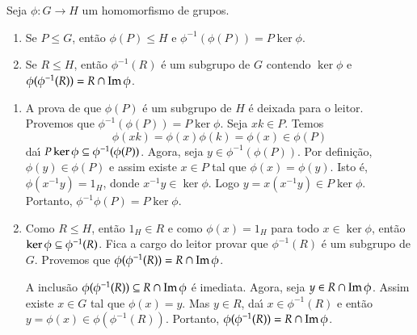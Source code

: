 \begin{lema}\label{imagem_direta_e_inversa_de_subgrupos}
	Seja $\phi : G \to H$ um homomorfismo de grupos.
	\begin{enumerate}[label=({\roman*})]
		\item Se $P \le G$, ent\~ao $\phi(P) \le H$ e $\phi^{-1}(\phi(P)) = P\ker\phi$.

		\item Se $R \le H$, ent\~ao $\phi^{-1}(R)$ \'e um subgrupo de $G$ contendo $\ker\phi$ e $\phi(\phi^{-1}(R)) = R \cap {\rm Im\,}\phi$.
	\end{enumerate}
\end{lema}
\begin{prova}
	\begin{enumerate}[label=({\roman*})]
		\item A prova de que $\phi(P)$ \'e um subgrupo de $H$ \'e deixada para o leitor. Provemos que $\phi^{-1}(\phi(P)) = P\ker\phi$. Seja $xk \in P$. Temos
		\[
			\phi(xk) = \phi(x)\phi(k) = \phi(x) \in \phi(P)
		\]
		da{\'\i} $P\ker\phi \subseteq \phi^{-1}(\phi(P))$. Agora, seja $y \in \phi^{-1}(\phi(P))$. Por defini\c{c}\~ao, $\phi(y) \in \phi(P)$ e assim existe $x \in P$ tal que $\phi(x) = \phi(y)$. Isto \'e, $\phi(x^{-1}y) = 1_H$, donde $x^{-1}y \in \ker\phi$. Logo $y = x(x^{-1}y)\in P\ker\phi$. Portanto, $\phi^{-1}\phi(P) = P\ker\phi$.

		\item Como $R \le H$, ent\~ao $1_H \in R$ e como $\phi(x) = 1_H$ para todo $x \in \ker\phi$, ent\~ao $\ker\phi \subseteq \phi^{-1}(R)$. Fica a cargo do leitor provar que $\phi^{-1}(R)$ \'e um subgrupo de $G$. Provemos que $\phi(\phi^{-1}(R)) = R \cap {\rm Im\,}\phi$.

		A inclus\~ao $\phi(\phi^{-1}(R)) \subseteq R \cap {\rm Im\,}\phi$ \'e imediata. Agora, seja $y \in R \cap {\rm Im\,}\phi$. Assim existe $x \in G$ tal que $\phi(x) = y$. Mas $y \in R$, da{\'\i} $x \in \phi^{-1}(R)$ e ent\~ao $y = \phi(x) \in \phi(\phi^{-1}(R))$. Portanto, $\phi(\phi^{-1}(R)) = R \cap {\rm Im\,}\phi$.
	\end{enumerate}
\end{prova}

